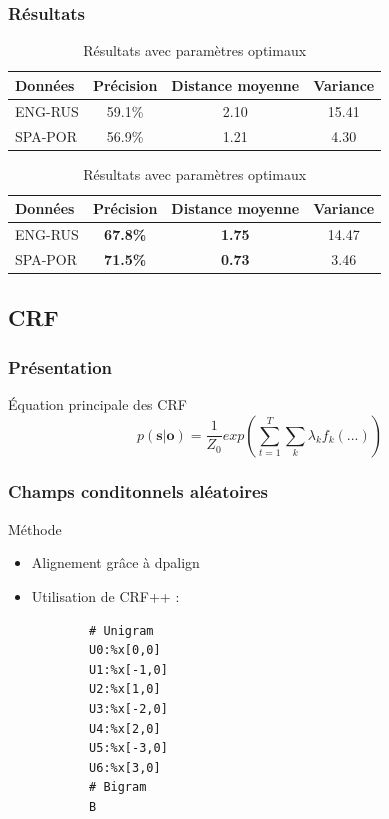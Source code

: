 \documentclass{beamer}
\begin{document}
\begin{frame}
    \frametitle{Résultats}
\begin{table}[H]
\caption{Résultats de la baseline (paramètres par défaut)}
\label{table_baseline_smt}
\begin{tabular}{|l|c|c|c|}
\hline
Données&Précision&Distance moyenne&Variance\\
\hline
ENG-RUS&59.1\%&2.10&15.41\\
\hline
SPA-POR&56.9\%&1.21&4.30\\
\hline
\end{tabular}

\caption{Résultats avec paramètres optimaux}
\label{table_opt_smt}
\begin{tabular}{|l|c|c|c|}
\hline
Données&Précision&Distance moyenne&Variance\\
\hline
ENG-RUS&\textbf{67.8\%}&\textbf{1.75}&14.47\\
\hline
SPA-POR&\textbf{71.5\%}&\textbf{0.73}&3.46\\
\hline
\end{tabular}
\end{table}
\end{frame}



\subsection{CRF}


\begin{frame}
\tableofcontents[sectionstyle=show/shaded, subsectionstyle=show/shaded/hide] 
\end{frame}

\begin{frame}
\frametitle{Présentation}
\begin{block}{Équation principale des CRF}
\begin{equation}
p(\textbf{s}|\textbf{o}) = \frac{1}{Z_0}exp(\sum_{t=1}^T\sum_k \lambda_k f_k(...))
\label{eqcrf}
\end{equation}
\end{block}
\end{frame}

\begin{frame}[fragile]
\frametitle{Champs conditonnels aléatoires}
	\begin{block}{Méthode}
		\begin{itemize}
		\item Alignement grâce à dpalign
		\item Utilisation de CRF++ :
		{\scriptsize \begin{verbatim}
		# Unigram
		U0:%x[0,0]
		U1:%x[-1,0]
		U2:%x[1,0]
		U3:%x[-2,0]
		U4:%x[2,0]
		U5:%x[-3,0]
		U6:%x[3,0]
		# Bigram
		B
		\end{verbatim}}
		\end{itemize}
	\end{block}
\end{frame}
\end{document}
